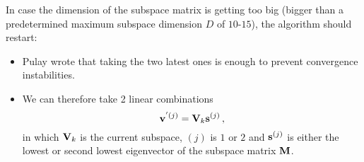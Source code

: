        In case the dimension of the subspace matrix is getting too big (bigger than a predetermined maximum subspace dimension $D$ of $10$-$15$), the algorithm should restart:
        \begin{itemize}
            \item Pulay wrote that taking the two latest ones is enough to prevent convergence instabilities.
            \item We can therefore take 2 linear combinations
                \begin{equation}
                    \vb{v}^{'(j)} = \vb{V}_k \vb{s}^{(j)} \thinspace ,
                \end{equation}
                in which $\vb{V}_k$ is the current subspace, $(j)$ is $1$ or $2$ and $\vb{s}^{(j)}$ is either the lowest or second lowest eigenvector of the subspace matrix $\vb{M}$.
        \end{itemize}
